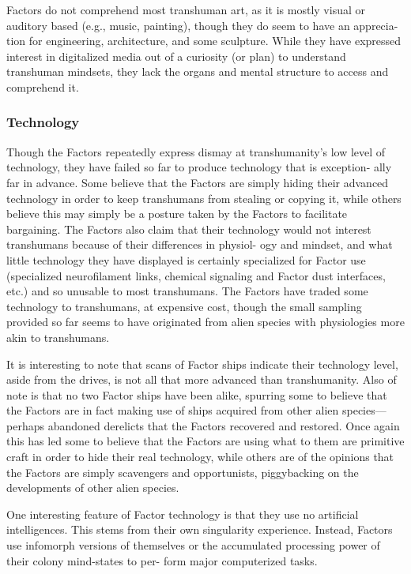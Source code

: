 Factors do not comprehend most transhuman art, 
as it is mostly visual or auditory based (e.g., music, 
painting), though they do seem to have an apprecia-
tion for engineering, architecture, and some sculpture. 
While they have expressed interest in digitalized media 
out of a curiosity (or plan) to understand transhuman 
mindsets, they lack the organs and mental structure to 
access and comprehend it. 

\subsubsection{Technology}

Though the Factors repeatedly express dismay at 
transhumanity's low level of technology, they have 
failed so far to produce technology that is exception-
ally far in advance. Some believe that the Factors are 
simply hiding their advanced technology in order to 
keep transhumans from stealing or copying it, while 
others believe this may simply be a posture taken 
by the Factors to facilitate bargaining. The Factors 
also claim that their technology would not interest 
transhumans because of their differences in physiol-
ogy and mindset, and what little technology they 
have displayed is certainly specialized for Factor use 
(specialized neurofilament links, chemical signaling 
and Factor dust interfaces, etc.) and so unusable to 
most transhumans. The Factors have traded some 
technology to transhumans, at expensive cost, though 
the small sampling provided so far seems to have 
originated from alien species with physiologies more 
akin to transhumans.

It is interesting to note that scans of Factor ships 
indicate their technology level, aside from the drives, 
is not all that more advanced than transhumanity. 
Also of note is that no two Factor ships have been 
alike, spurring some to believe that the Factors are 
in fact making use of ships acquired from other alien 
species—perhaps abandoned derelicts that the Factors 
recovered and restored. Once again this has led some 
to believe that the Factors are using what to them are 
primitive craft in order to hide their real technology, 
while others are of the opinions that the Factors are 
simply scavengers and opportunists, piggybacking on 
the developments of other alien species.

One interesting feature of Factor technology is that 
they use no artificial intelligences. This stems from 
their own singularity experience. Instead, Factors use 
infomorph versions of themselves or the accumulated 
processing power of their colony mind-states to per-
form major computerized tasks. 

